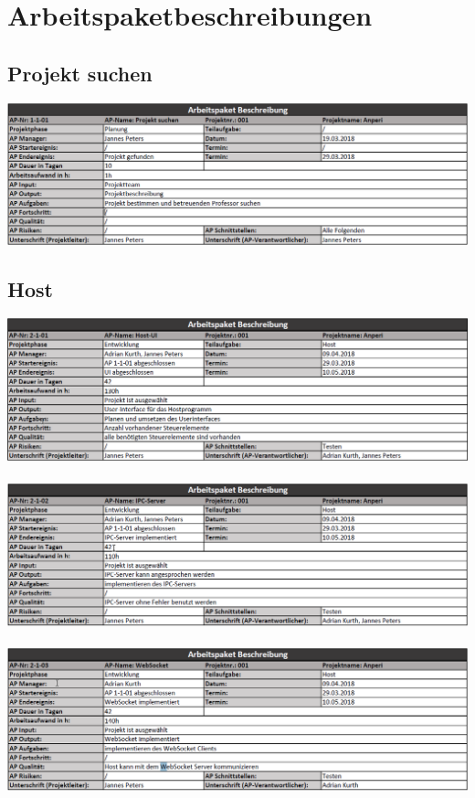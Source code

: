 \documentclass{scrartcl}
\begin{document}
\section{Arbeitspaketbeschreibungen}
\subsection{Projekt suchen}
\includegraphics[scale=0.6]{ArbeitsPakete/AP1-1-01.png}
\subsection{Host}
\includegraphics[scale=0.6]{ArbeitsPakete/AP2-1-01.png}
\\
\\
\includegraphics[scale=0.6]{ArbeitsPakete/AP2-1-02.png}
\\
\\
\includegraphics[scale=0.6]{ArbeitsPakete/AP2-1-03.png}
\end{document}
